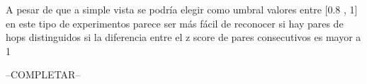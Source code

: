 
\par A pesar de que a simple vista se podr\'ia elegir como umbral valores entre [0.8 , 1] en este tipo de experimentos parece ser más f\'acil de reconocer si hay pares de hops distinguidos si la diferencia entre el z score de pares consecutivos es mayor a 1 

--COMPLETAR--
